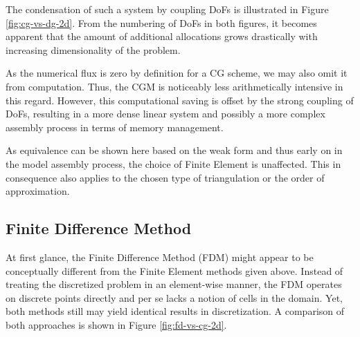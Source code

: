 \documentclass[asi,article,submit,moreauthors]{Definitions/mdpi}
\begin{document}
The condensation of such a system by coupling DoFs is illustrated in Figure \ref{fig:cg-vs-dg-2d}.
From the numbering of DoFs in both figures, it becomes apparent that the amount of additional allocations grows drastically with increasing dimensionality of the problem.

As the numerical flux is zero by definition for a CG scheme, we may also omit it from computation.
Thus, the CGM is noticeably less arithmetically intensive in this regard.
However, this computational saving is offset by the strong coupling of DoFs, resulting in a more dense linear system and possibly a more complex assembly process in terms of memory management.

As equivalence can be shown here based on the weak form and thus early on in the model assembly process, the choice of Finite Element is unaffected.
This in consequence also applies to the chosen type of triangulation or the order of approximation.

\subsection{Finite Difference Method}\label{sec:fdm}

At first glance, the Finite Difference Method (FDM) might appear to be conceptually different from the Finite Element methods given above. Instead of treating the discretized problem in an element-wise manner, the FDM operates on discrete points directly and per se lacks a notion of cells in the domain.
Yet, both methods still may yield identical results in discretization.
A comparison of both approaches is shown in Figure \ref{fig:fd-vs-cg-2d}.
\end{document}
